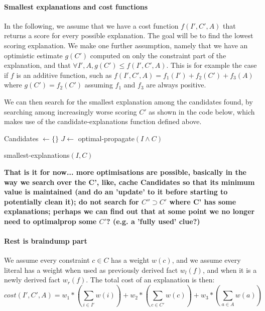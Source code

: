 \paragraph{Smallest explanations and cost functions}
In the following, we assume that we have a cost function $f(I', C', A)$ that returns a score for every possible explanation. The goal will be to find the lowest scoring explanation. We make one further assumption, namely that we have an optimistic estimate $g(C')$ computed on only the constraint part of the explanation, and that $\forall I', A, g(C') \leq f(I', C', A)$. This is for example the case if $f$ is an additive function, such as $f(I', C', A) = f_1(I') + f_2(C') + f_3(A)$ where $g(C') = f_2(C')$ assuming $f_1$ and $f_3$ are always positive.

We can then search for the smallest explanation among the candidates found, by searching among increasingly worse scoring $C'$ as shown in the code below, which makes use of the candidate-explanations function defined above.

\begin{algorithm}


  Candidates $\gets \{\}$\;
  $J \gets$ optimal-propagate$(I \wedge C)$\;
\caption{smallest-explanations$(I,C)$}
\label{alg:cand}
\end{algorithm}



\textbf{That is it for now... more optimisations are possible, basically in the way we search over the C', like, cache Candidates so that its minimum value is maintained (and do an 'update' to it before starting to potentially clean it); do not search for $C'' \supset C'$ where C' has some explanations; perhaps we can find out that at some point we no longer need to optimalprop some $C'$? (e.g. a 'fully used' clue?)}

\paragraph{Rest is braindump part}
We assume every constraint $c \in C$ has a weight $w(c)$, and we assume every literal has a weight when used as previously derived fact $w_l(f)$, and when it is a newly derived fact $w_r(f)$. The total cost of an explanation is then:
$$ cost(I', C', A) = w_1*(\sum_{i \in I'} w(i)) + w_2*(\sum_{c \in C'} w(c)) + w_3*(\sum_{a \in A} w(a))$$

